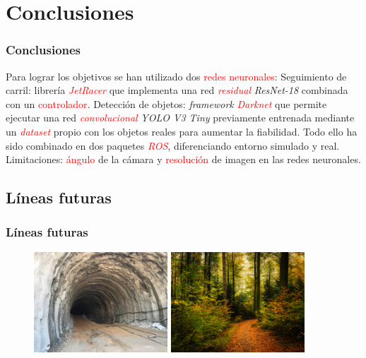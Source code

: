 \documentclass{beamer}
\begin{document}
\section{Conclusiones}
\begin{frame}
	\frametitle{Conclusiones}
	\begin{outline}
		\1 Para lograr los objetivos se han utilizado dos \textcolor{red}{redes neuronales}:
		\2 Seguimiento de carril: librería \textcolor{red}{\textit{JetRacer}} que implementa una red \textcolor{red}{\textit{residual}} \textit{ResNet-18} combinada con un
		\textcolor{red}{controlador}.
		\2 Detección de objetos: \textit{framework} \textcolor{red}{\textit{Darknet}} que permite ejecutar una red \textcolor{red}{\textit{convolucional}} \textit{YOLO V3
			Tiny} previamente entrenada mediante un \textcolor{red}{\textit{dataset}} propio con los objetos reales para aumentar la fiabilidad.
		\1 Todo ello ha sido combinado en dos paquetes \textcolor{red}{\textit{ROS}}, diferenciando entorno simulado y real.
		\1 Limitaciones: \textcolor{red}{ángulo} de la cámara y \textcolor{red}{resolución} de imagen en las redes neuronales.
	\end{outline}
\end{frame}

\subsection{Líneas futuras}
\begin{frame}
	\frametitle{Líneas futuras}
	\begin{figure}
		\centering
		\includegraphics[width=5cm]{figs/tunel}\hspace{0.5cm}
		\includegraphics[width=5cm]{figs/forest}
	\end{figure}
\end{frame}

\begin{frame}[plain]
	\large{\titlepage}
\end{frame}
\end{document}
